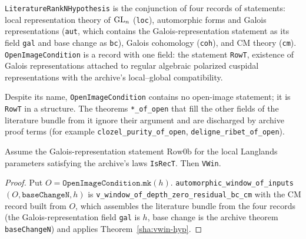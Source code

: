 \begin{definition}\label{sha:litn}
\texttt{LiteratureRankNHypothesis} is the conjunction of four records of statements: local
representation theory of $\mathrm{GL}_n$ (\texttt{loc}), automorphic forms and Galois representations
(\texttt{aut}, which contains the Galois-representation statement as its field \texttt{gal}
and base change as \texttt{bc}), Galois cohomology (\texttt{coh}), and CM theory
(\texttt{cm}). \texttt{OpenImageCondition} is a record with one field: the statement
\texttt{RowT}, existence of Galois representations attached to regular algebraic polarized
cuspidal representations with the archive's local--global compatibility.
\end{definition}

\begin{remark}\label{sha:rem-open}
Despite its name, \texttt{OpenImageCondition} contains no open-image statement; it is
\texttt{RowT} in a structure. The theorems \texttt{*\_of\_open} that fill the other fields of
the literature bundle from it ignore their argument and are discharged by archive proof terms
(for example \texttt{clozel\_purity\_of\_open}, \texttt{deligne\_ribet\_of\_open}).
\end{remark}

\begin{theorem}\label{sha:vwin-of-row}
Assume the Galois-representation statement $\mathrm{Row0b}$ for the local Langlands
parameters satisfying the archive's laws \texttt{IsRecT}. Then \texttt{VWin}.
\end{theorem}
\begin{proof}
Put $O=\texttt{OpenImageCondition.mk}(h)$. \texttt{automorphic\_window\_of\_inputs}$(O,
\texttt{baseChangeN},h)$ is \texttt{v\_window\_of\_depth\_zero\_residual\_bc\_cm} with the CM
record built from $O$, which assembles the literature bundle from the four records (the
Galois-representation field \texttt{gal} is $h$, base change is the archive theorem
\texttt{baseChangeN}) and applies Theorem~\ref{sha:vwin-hyp}.
\end{proof}
